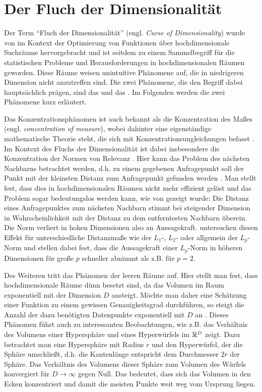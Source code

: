 \section{Der Fluch der Dimensionalität}
\label{ch:Dimensionsreduktion:FluchDerDim}

Der Term \enquote{Fluch der Dimensionalität} (engl. \textit{Curse of Dimensionality}) wurde von
\textcite{Bellman.1961} im Kontext der Optimierung von Funktionen über hochdimensionale Suchräume
hervorgebracht und ist seitdem zu einem Sammelbegriff für die statistischen Probleme und
Herausforderungen in hochdimensionalen Räumen geworden. Diese Räume weisen unintuitive Phänomene
auf, die in niedrigeren Dimension nicht anzutreffen sind. Die zwei Phänomene, die den Begriff dabei
hauptsächlich prägen, sind das  und das
 \parencite[6 -- 9]{Lee.2007}. Im Folgenden werden die zwei Phänomene kurz erläutert.

Das Konzentrationsphänomen ist auch bekannt als die Konzentration des Maßes (engl.
\textit{concentration of measure}), wobei dahinter eine eigenständige mathematische Theorie steht,
die sich mit Konzentrationsungleichungen befasst \parencite{Ledoux.2001}. Im Kontext des Fluchs der Dimensionalität ist dabei insbesondere die
Konzentration der Normen von Relevanz \parencites[siehe z.B.][]{Kumari.2017}{Verleysen.2005}. Hier kann das Problem des nächsten Nachbarns
betrachtet werden, d.h. zu einem gegebenen Anfragepunkt soll der Punkt mit der kleinsten Distanz
zum Anfragepunkt gefunden werden \parencite[217]{Beyer.1999}. Man stellt fest, dass dies in hochdimensionalen Räumen nicht mehr
effizient gelöst und das Problem sogar bedeutungslos werden kann, wie von \textcite{Beyer.1999}
gezeigt wurde: Die Distanz eines Anfragepunktes zum nächsten Nachbarn stimmt bei steigender
Dimension in Wahrscheinlichkeit mit der Distanz zu dem entferntesten Nachbarn überein. Die Norm
verliert in hohen Dimensionen also an Aussagekraft. \textcite{Aggarwal.2001} untersuchen diesen
Effekt für unterschiedliche Distanzmaße wie der $L_1$-, $L_2$- oder allgemein der $L_p$-Norm und
stellen dabei fest, dass die Aussagekraft einer $L_p$-Norm in höheren Dimensionen für große $p$
schneller abnimmt als z.B. für $p = 2$.

Des Weiteren tritt das Phänomen der leeren Räume auf. Hier stellt man fest, dass hochdimensionale
Räume dünn besetzt sind, da das Volumen im Raum exponentiell mit der Dimension $D$ ansteigt. Möchte
man daher eine Schätzung einer Funktion zu einem gewissen Genauigkeitsgrad durchführen, so steigt
die Anzahl der dazu benötigten Datenpunkte exponentiell mit $D$ an \parencite[6]{Lee.2007}. Dieses Phänomen führt auch zu interessanten Beobachtungen, wie z.B. das
Verhältnis des Volumens einer Hypersphäre und eines Hyperwürfels im $\mathbb{R}^D$ zeigt. Dazu
betrachtet man eine Hypersphäre mit Radius $r$ und den Hyperwürfel, der die Sphäre umschließt, d.h.
die Kantenlänge entspricht dem Durchmesser $2r$ der Sphäre. Das Verhältnis des Volumens dieser
Sphäre zum Volumen des Würfels konvergiert für $D \rightarrow \infty$ gegen Null. Das bedeutet,
dass sich das Volumen in den Ecken konzentriert \parencite[6 -- 7]{Lee.2007} und damit die meisten Punkte weit weg vom Ursprung liegen.

